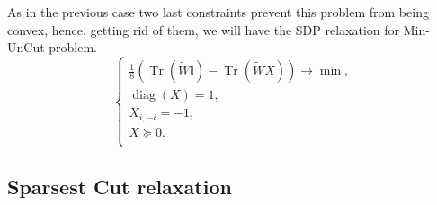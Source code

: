 \documentclass[12pt]{article}
\DeclareMathOperator{\trace}{Tr}
\DeclareMathOperator{\diag}{diag}
\begin{document}
As in the previous case two last constraints prevent this problem from being convex, hence, getting rid of them, we will have the SDP relaxation for Min-UnCut problem.
\begin{equation}
    \label{minuncut_rel}
    \begin{cases}
        \frac 18 \left(\trace(\tilde W \mathbb{I}) - \trace( \tilde W X)\right) \longrightarrow \min,\\
        \diag(X) = 1,\\
        X_{i, -i} = -1,\\
        X \succeq 0.\\
    \end{cases}
\end{equation}

\subsection{Sparsest Cut relaxation}
\end{document}
